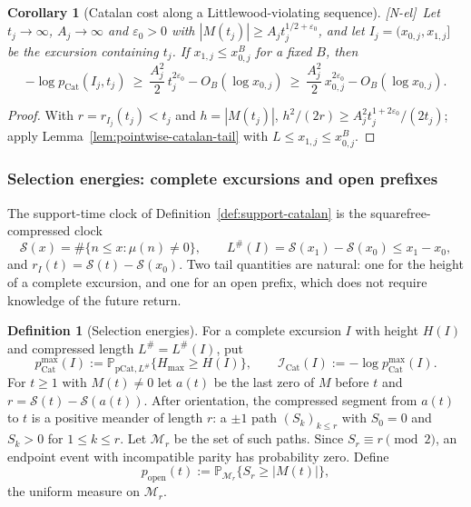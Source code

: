 \documentclass[11pt,reqno]{amsart}
\numberwithin{equation}{section}
\theoremstyle{plain}
\newtheorem{corollary}[theorem]{Corollary}
\theoremstyle{definition}
\newtheorem{definition}[theorem]{Definition}
\theoremstyle{remark}
\newcommand{\eps}{\varepsilon}
\newcommand{\Sq}{\mathcal{S}}
\newcommand{\tagNE}{\textup{[N-el]}}
\begin{document}
\begin{corollary}[Catalan cost along a Littlewood-violating sequence]
\label{cor:catalan-sequence}
\tagNE\ Let $t_j\to\infty$, $A_j\to\infty$ and $\eps_0>0$ with
$|M(t_j)|\ge A_jt_j^{1/2+\eps_0}$, and let $I_j=(x_{0,j},x_{1,j}]$ be the
excursion containing $t_j$. If $x_{1,j}\le x_{0,j}^{B}$ for a fixed $B$,
then
\begin{equation}
-\log p_{\mathrm{Cat}}(I_j,t_j)\ \ge\ \frac{A_j^2}{2}\,t_j^{2\eps_0}
-O_B(\log x_{0,j})\ \ge\ \frac{A_j^2}{2}\,x_{0,j}^{2\eps_0}-O_B(\log x_{0,j}).
\end{equation}
\end{corollary}

\begin{proof}
With $r=r_{I_j}(t_j)<t_j$ and $h=|M(t_j)|$,
$h^2/(2r)\ge A_j^2t_j^{1+2\eps_0}/(2t_j)$; apply
Lemma~\ref{lem:pointwise-catalan-tail} with $L\le x_{1,j}\le x_{0,j}^B$.
\end{proof}

\subsubsection{Selection energies: complete excursions and open prefixes}
\label{subsubsec:selection-energies}

The support-time clock of Definition~\ref{def:support-catalan} is the
squarefree-compressed clock
\begin{equation}
\Sq(x)=\#\{n\le x:\mu(n)\ne0\},\qquad L^\#(I)=\Sq(x_1)-\Sq(x_0)\le x_1-x_0,
\end{equation}
and $r_I(t)=\Sq(t)-\Sq(x_0)$. Two tail quantities are natural: one for the
height of a complete excursion, and one for an open prefix, which does not
require knowledge of the future return.

\begin{definition}[Selection energies]
\label{def:selection-energies}
For a complete excursion $I$ with height $H(I)$ and compressed length
$L^\#=L^\#(I)$, put
\begin{equation}
p^{\max}_{\mathrm{Cat}}(I):=\mathbb P_{\mathrm{pCat},L^\#}\{H_{\max}\ge H(I)\},
\qquad
\mathcal I_{\mathrm{Cat}}(I):=-\log p^{\max}_{\mathrm{Cat}}(I).
\end{equation}
For $t\ge1$ with $M(t)\ne0$ let $a(t)$ be the last zero of $M$ before $t$ and
$r=\Sq(t)-\Sq(a(t))$. After orientation, the compressed segment from $a(t)$ to
$t$ is a positive meander of length $r$: a $\pm1$ path $(S_k)_{k\le r}$ with
$S_0=0$ and $S_k>0$ for $1\le k\le r$. Let $\mathcal M_r$ be the set of such
paths.  Since $S_r\equiv r\pmod 2$, an endpoint event with incompatible
parity has probability zero.  Define
\begin{equation}
p_{\mathrm{open}}(t):=\mathbb P_{\mathcal M_r}\{S_r\ge|M(t)|\},
\end{equation}
the uniform measure on $\mathcal M_r$.
\end{definition}
\end{document}
